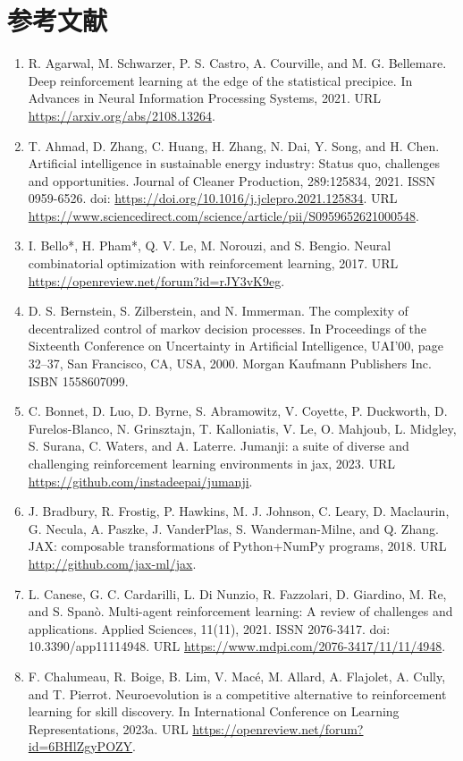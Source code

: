 \documentclass[11pt,UTF8,fontset=fandol]{ctexart}
\begin{document}
\section*{参考文献}
\begin{enumerate}[leftmargin=2em,itemsep=2pt]
\item R. Agarwal, M. Schwarzer, P. S. Castro, A. Courville, and M. G. Bellemare. Deep reinforcement learning at the edge of the statistical precipice. In Advances in Neural Information Processing Systems, 2021. URL \url{https://arxiv.org/abs/2108.13264}.
\item T. Ahmad, D. Zhang, C. Huang, H. Zhang, N. Dai, Y. Song, and H. Chen. Artificial intelligence in sustainable energy industry: Status quo, challenges and opportunities. Journal of Cleaner Production, 289:125834, 2021. ISSN 0959-6526. doi: \url{https://doi.org/10.1016/j.jclepro.2021.125834}. URL \url{https://www.sciencedirect.com/science/article/pii/S0959652621000548}.
\item I. Bello*, H. Pham*, Q. V. Le, M. Norouzi, and S. Bengio. Neural combinatorial optimization with reinforcement learning, 2017. URL \url{https://openreview.net/forum?id=rJY3vK9eg}.
\item D. S. Bernstein, S. Zilberstein, and N. Immerman. The complexity of decentralized control of markov decision processes. In Proceedings of the Sixteenth Conference on Uncertainty in Artificial Intelligence, UAI'00, page 32--37, San Francisco, CA, USA, 2000. Morgan Kaufmann Publishers Inc. ISBN 1558607099.
\item C. Bonnet, D. Luo, D. Byrne, S. Abramowitz, V. Coyette, P. Duckworth, D. Furelos-Blanco, N. Grinsztajn, T. Kalloniatis, V. Le, O. Mahjoub, L. Midgley, S. Surana, C. Waters, and A. Laterre. Jumanji: a suite of diverse and challenging reinforcement learning environments in jax, 2023. URL \url{https://github.com/instadeepai/jumanji}.
\item J. Bradbury, R. Frostig, P. Hawkins, M. J. Johnson, C. Leary, D. Maclaurin, G. Necula, A. Paszke, J. VanderPlas, S. Wanderman-Milne, and Q. Zhang. JAX: composable transformations of Python+NumPy programs, 2018. URL \url{http://github.com/jax-ml/jax}.
\item L. Canese, G. C. Cardarilli, L. Di Nunzio, R. Fazzolari, D. Giardino, M. Re, and S. Span\`o. Multi-agent reinforcement learning: A review of challenges and applications. Applied Sciences, 11(11), 2021. ISSN 2076-3417. doi: 10.3390/app11114948. URL \url{https://www.mdpi.com/2076-3417/11/11/4948}.
\item F. Chalumeau, R. Boige, B. Lim, V. Mac\'e, M. Allard, A. Flajolet, A. Cully, and T. Pierrot. Neuroevolution is a competitive alternative to reinforcement learning for skill discovery. In International Conference on Learning Representations, 2023a. URL \url{https://openreview.net/forum?id=6BHlZgyPOZY}.

\end{enumerate}
\end{document}
